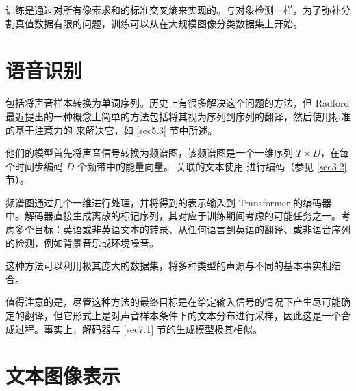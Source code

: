 训练是通过对所有像素求和的标准交叉熵来实现的。与对象检测一样，为了弥补分割真值数据有限的问题，训练可以从在大规模图像分类数据集上开始。

\section{语音识别}\label{sec6.5}

包括将声音样本转换为单词序列。历史上有很多解决这个问题的方法，但 Radford \cite{arxiv-2212.04356} 最近提出的一种概念上简单的方法包括将其视为序列到序列的翻译，然后使用标准的基于注意力的  来解决它，如 \ref{sec5.3} 节中所述。

他们的模型首先将声音信号转换为频谱图，该频谱图是一个一维序列 $T \times D$，在每个时间步编码 $D$ 个频带中的能量向量。 关联的文本使用 进行编码（参见 \ref{sec3.2} 节）。

频谱图通过几个一维进行处理，并将得到的表示输入到 Transformer 的编码器中。解码器直接生成离散的标记序列，其对应于训练期间考虑的可能任务之一。考虑多个目标：英语或非英语文本的转录、从任何语言到英语的翻译、或非语音序列的检测，例如背景音乐或环境噪音。

这种方法可以利用极其庞大的数据集，将多种类型的声源与不同的基本事实相结合。

值得注意的是，尽管这种方法的最终目标是在给定输入信号的情况下产生尽可能确定的翻译，但它形式上是对声音样本条件下的文本分布进行采样，因此这是一个合成过程。事实上，解码器与 \ref{sec7.1} 节的生成模型极其相似。

\section{文本图像表示}\label{sec6.6}

